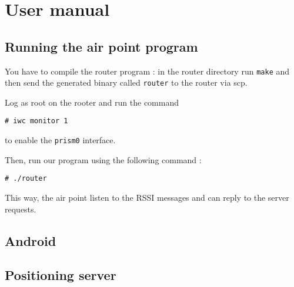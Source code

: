\section{User manual}

\subsection{Running the air point program}

You have to compile the router program : in the router directory run \verb+make+
and then send the generated binary called \verb+router+ to the router via scp.

Log as root on the rooter and run the command 

\verb+# iwc monitor 1+

to enable the \verb+prism0+ interface.

Then, run our program using the following command :

\verb+# ./router+

This way, the air point listen to the RSSI messages and can reply to the server
requests.

\subsection{Android}

\subsection{Positioning server}

